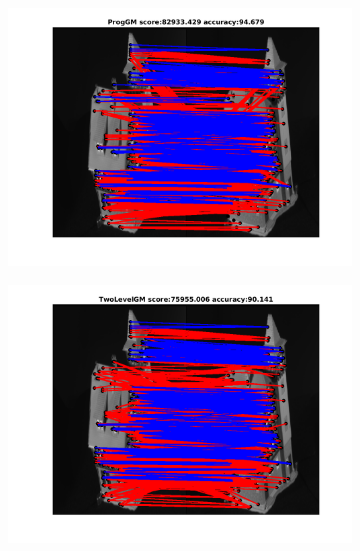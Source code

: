 \documentclass[
	fontsize=12pt,
	paper=a4,
	twoside=false,
	numbers=noenddot,
	plainheadsepline,
	toc=listof,
	toc=bibliography
]{scrartcl}
\begin{document}
\begin{figure}[h] 	
	\begin{subfigure}[b]{0.3\textwidth}
		\centering
		\includegraphics[scale=0.25]{"fig_ver2608/RealImages/HouseSeq/no_descr/using_cpd_afftrafo/ext_solution/fi_4_ProgGM"}  
	\end{subfigure}%
	\begin{subfigure}[b]{0.3\textwidth}
		\centering
		\includegraphics[scale=0.25]{"fig_ver2608/RealImages/HouseSeq/no_descr/using_cpd_afftrafo/ext_solution/fi_4_TwoLevelGM"}  
	\end{subfigure} 
	\begin{subfigure}[b]{0.3\textwidth}
		\centering

\end{subfigure}
\end{figure}
\end{document}
